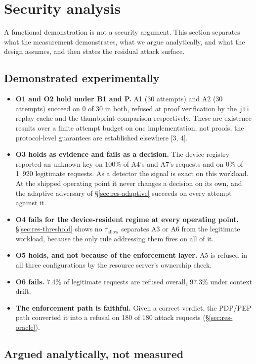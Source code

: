 \section{Security analysis}
\label{sec:security}

A functional demonstration is not a security argument. This section separates what the measurement demonstrates, what we argue analytically, and what the design assumes, and then states the residual attack surface.

\subsection{Demonstrated experimentally}

\begin{itemize}
  \item \textbf{O1 and O2 hold under B1 and P.} A1 (30 attempts) and A2 (30 attempts) succeed on 0 of 30 in both, refused at proof verification by the \texttt{jti} replay cache and the thumbprint comparison respectively. These are existence results over a finite attempt budget on one implementation, not proofs; the protocol-level guarantees are established elsewhere [3, 4].
  \item \textbf{O3 holds as evidence and fails as a decision.} The device registry reported an unknown key on 100\% of A4's and A7's requests and on 0\% of 1~920 legitimate requests. As a detector the signal is exact on this workload. At the shipped operating point it never changes a decision on its own, and the adaptive adversary of \S\ref{sec:res-adaptive} succeeds on every attempt against it.
  \item \textbf{O4 fails for the device-resident regime at every operating point.} \S\ref{sec:res-threshold} shows no $\tau_{\mathrm{allow}}$ separates A3 or A6 from the legitimate workload, because the only rule addressing them fires on all of it.
  \item \textbf{O5 holds, and not because of the enforcement layer.} A5 is refused in all three configurations by the resource server's ownership check.
  \item \textbf{O6 fails.} 7.4\% of legitimate requests are refused overall, 97.3\% under context drift.
  \item \textbf{The enforcement path is faithful.} Given a correct verdict, the PDP/PEP path converted it into a refusal on 180 of 180 attack requests (\S\ref{sec:res-oracle}).
\end{itemize}

\subsection{Argued analytically, not measured}


